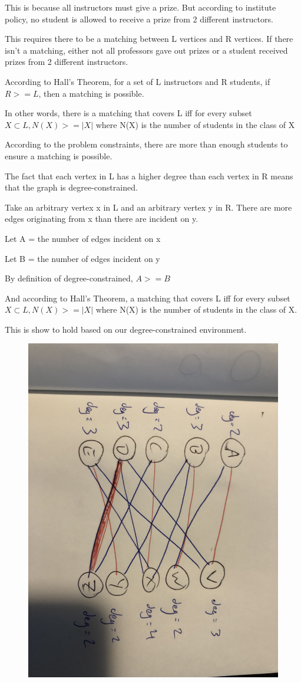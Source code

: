 \documentclass{6042}
\begin{document}
This is because all instructors must give a prize. But according to institute policy, no student is allowed to receive a prize from
2 different instructors.

This requires there to be a matching between L vertices and R vertices. If there isn't a matching, either not all professors gave out prizes or a student received prizes from 2 different instructors.


According to Hall's Theorem, for a set of L instructors and R students, if $R >= L$, then a matching is possible.

In other words, there is a matching that covers L iff for every subset $X \subset{L}, N(X) >= |X|$ where N(X) is the number of students in the class of X 

According to the problem constraints, there are more than enough students to ensure a matching is possible.


The fact that each vertex in L has a higher degree than each vertex in R means that the graph is degree-constrained.

Take an arbitrary vertex x in L and an arbitrary vertex y in R. There are more edges originating from x than there are incident on y.

Let A = the number of edges incident on x

Let B = the number of edges incident on y

By definition of degree-constrained, $A >= B$

And according to Hall's Theorem, a matching that covers L iff for every subset $X \subset{L}, N(X) >= |X|$ where N(X) is the number of students in the class of X.

This is show to hold based on our degree-constrained environment.


\begin{figure}[h!]
    \includegraphics[width=0.6\linewidth]{prob3graph.jpg}

\end{figure}
\end{document}

